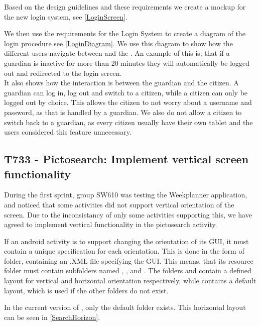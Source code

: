 Based on the design guidelines \cite{DesignManual} and these requirements we
create a mockup for the new login system, see \autoref{LoginScreen}.


We then use the requirements for the Login System to create a diagram of the
login procedure see \autoref{LoginDiagram}. We use this diagram to show how the
different users navigate between  and the . An example of this is, that if a guardian is inactive for more
than 20 minutes they will automatically be logged out and redirected to the login screen.\\
It also shows how the interaction is between the guardian and the citizen. A
guardian can log in, log out and switch to a citizen, while a citizen can only
be logged out by choice. This allows the citizen to not worry about a username
and password, as that is handled by a guardian. We also do not allow a citizen
to switch back to a guardian, as every citizen usually have their own tablet
and the users considered this feature unnecessary.


\subsection{T733 - Pictosearch: Implement vertical screen functionality}
During the first sprint, group SW610 was testing the Weekplanner application,
and noticed that some activities did not support vertical orientation of the
screen. Due to the inconsistancy of only some activities supporting this, we
have agreed to implement vertical functionality in the pictosearch activity.\nl

If an android activity is to support changing the orientation of its GUI, it
must contain a unique specification for each orientation. This is done in the
form of folder, containing an .XML file specifying the GUI. This means, that its
resource folder  must contain subfolders named ,
, and . The folders 
and  contain a defined layout for vertical and horizontal
orientation respectively, while  contains a default layout, which
is used if the other folders do not exist.\nl

In the current version of , only the default folder
 exists. This horizontal layout can be seen in
\autoref{SearchHorizon}.

